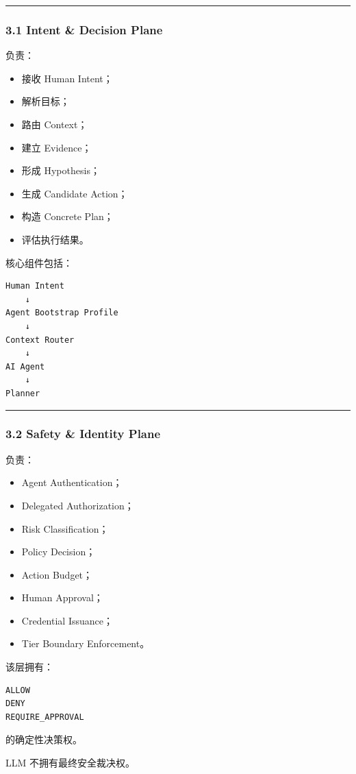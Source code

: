 \documentclass[11pt,a4paper]{article}
\begin{document}
\vspace{0.5em}\hrule\vspace{0.5em}
\subsubsection{3.1 Intent \& Decision Plane}
负责：

\begin{itemize}
  \item 接收 Human Intent；
  \item 解析目标；
  \item 路由 Context；
  \item 建立 Evidence；
  \item 形成 Hypothesis；
  \item 生成 Candidate Action；
  \item 构造 Concrete Plan；
  \item 评估执行结果。
\end{itemize}
核心组件包括：

\begin{lstlisting}[language=text]
Human Intent
    ↓
Agent Bootstrap Profile
    ↓
Context Router
    ↓
AI Agent
    ↓
Planner
\end{lstlisting}
\vspace{0.5em}\hrule\vspace{0.5em}
\subsubsection{3.2 Safety \& Identity Plane}
负责：

\begin{itemize}
  \item Agent Authentication；
  \item Delegated Authorization；
  \item Risk Classification；
  \item Policy Decision；
  \item Action Budget；
  \item Human Approval；
  \item Credential Issuance；
  \item Tier Boundary Enforcement。
\end{itemize}
该层拥有：

\begin{lstlisting}[language=text]
ALLOW
DENY
REQUIRE_APPROVAL
\end{lstlisting}
的确定性决策权。

LLM 不拥有最终安全裁决权。
\end{document}
